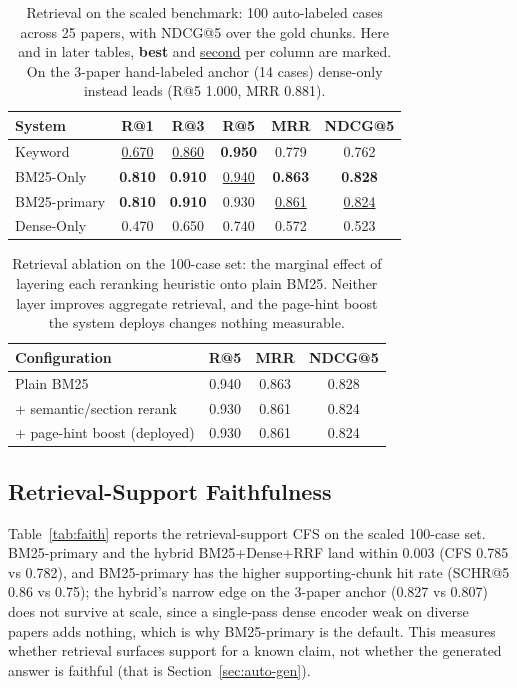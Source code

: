 \documentclass[letterpaper]{article} %
\newcommand{\best}[1]{\textbf{#1}}
\newcommand{\snd}[1]{\underline{#1}}
\begin{document}
\begin{table}[t]
  \centering
  \caption{Retrieval on the scaled benchmark: 100 auto-labeled cases across 25 papers,
           with NDCG@5 over the gold chunks. Here and in later tables, \best{best} and
           \snd{second} per column are marked. On the 3-paper hand-labeled anchor (14 cases)
           dense-only instead leads (R@5 1.000, MRR 0.881).}
  \label{tab:retrieval}
  \setlength{\tabcolsep}{3pt}
  \begin{tabular}{lccccc}
    \toprule
    \textbf{System} & \textbf{R@1} & \textbf{R@3} & \textbf{R@5} & \textbf{MRR} & \textbf{NDCG@5} \\
    \midrule
    Keyword         & \snd{0.670} & \snd{0.860} & \best{0.950} & 0.779 & 0.762 \\
    BM25-Only       & \best{0.810} & \best{0.910} & \snd{0.940} & \best{0.863} & \best{0.828} \\
    BM25-primary    & \best{0.810} & \best{0.910} & 0.930 & \snd{0.861} & \snd{0.824} \\
    Dense-Only      & 0.470 & 0.650 & 0.740 & 0.572 & 0.523 \\
    \bottomrule
  \end{tabular}
\end{table}

\begin{table}[t]
  \centering
  \caption{Retrieval ablation on the 100-case set: the marginal effect of layering each reranking
           heuristic onto plain BM25. Neither layer improves aggregate retrieval, and the page-hint
           boost the system deploys changes nothing measurable.}
  \label{tab:retrieval-ablation}
  \setlength{\tabcolsep}{3pt}
  \begin{tabular}{lccc}
    \toprule
    \textbf{Configuration} & \textbf{R@5} & \textbf{MRR} & \textbf{NDCG@5} \\
    \midrule
    Plain BM25                      & 0.940 & 0.863 & 0.828 \\
    \; + semantic/section rerank    & 0.930 & 0.861 & 0.824 \\
    \; + page-hint boost (deployed) & 0.930 & 0.861 & 0.824 \\
    \bottomrule
  \end{tabular}
\end{table}

\subsection{Retrieval-Support Faithfulness}
\label{sec:auto-faith}
Table~\ref{tab:faith} reports the retrieval-support CFS on the scaled 100-case set. BM25-primary
and the hybrid BM25+Dense+RRF land within 0.003 (CFS 0.785 vs 0.782), and BM25-primary has the
higher supporting-chunk hit rate (SCHR@5 0.86 vs 0.75); the hybrid's narrow edge on the 3-paper
anchor (0.827 vs 0.807) does not survive at scale, since a single-pass dense encoder weak on diverse
papers adds nothing, which is why BM25-primary is the default. This measures whether retrieval
surfaces support for a known claim, not whether the generated answer is faithful (that is
Section~\ref{sec:auto-gen}).
\end{document}
